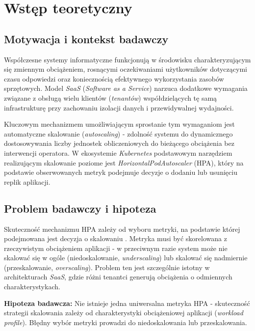 \chapter{Wstęp teoretyczny}

\section{Motywacja i kontekst badawczy}

Współczesne systemy informatyczne funkcjonują w środowisku charakteryzującym się zmiennym obciążeniem, rosnącymi oczekiwaniami użytkowników dotyczącymi czasu odpowiedzi oraz koniecznością efektywnego wykorzystania zasobów sprzętowych. Model \textit{SaaS} (\textit{Software as a Service}) narzuca dodatkowe wymagania związane z obsługą wielu klientów (\textit{tenantów}) współdzielących tę samą infrastrukturę przy zachowaniu izolacji danych i przewidywalnej wydajności.

Kluczowym mechanizmem umożliwiającym sprostanie tym wymaganiom jest automatyczne skalowanie (\textit{autoscaling}) - zdolność systemu do dynamicznego dostosowywania liczby jednostek obliczeniowych do bieżącego obciążenia bez interwencji operatora. W ekosystemie \textit{Kubernetes} podstawowym narzędziem realizującym skalowanie poziome jest \textit{HorizontalPodAutoscaler} (HPA), który na podstawie obserwowanych metryk podejmuje decyzje o dodaniu lub usunięciu replik aplikacji.
\section{Problem badawczy i hipoteza}

Skuteczność mechanizmu HPA zależy od wyboru metryki, na podstawie której podejmowana jest decyzja o skalowaniu %
. Metryka musi być skorelowana z rzeczywistym obciążeniem aplikacji - w przeciwnym razie system może nie skalować się w ogóle (niedoskalowanie, \textit{underscaling}) lub skalować się nadmiernie (przeskalowanie, \textit{overscaling}). Problem ten jest szczególnie istotny w architekturach \textit{SaaS}, gdzie różni tenantci generują obciążenia o odmiennych charakterystykach.

\textbf{Hipoteza badawcza:} Nie istnieje jedna uniwersalna metryka HPA - skuteczność strategii skalowania zależy od charakterystyki obciążeniowej aplikacji (\textit{workload profile}). Błędny wybór metryki prowadzi do niedoskalowania lub przeskalowania.

